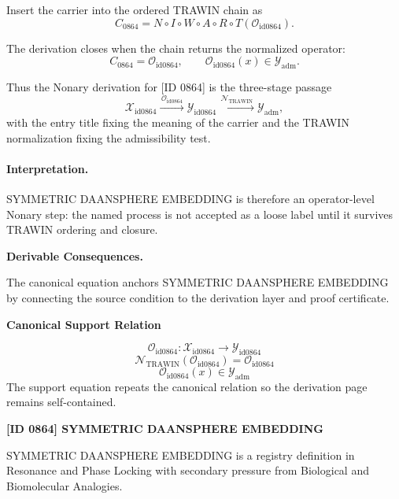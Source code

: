 Insert the carrier into the ordered TRAWIN chain as\[
C_{0864}=N\circ I\circ W\circ A\circ R\circ T(\mathcal{O}_{\mathrm{id0864}}).
\]

The derivation closes when the chain returns the normalized operator:\[
C_{0864}=\mathcal{O}_{\mathrm{id0864}},\qquad \mathcal{O}_{\mathrm{id0864}}(x)\in\mathcal{Y}_{\mathrm{adm}}.
\]

Thus the Nonary derivation for [ID 0864] is the three-stage passage
\[
\mathcal{X}_{\mathrm{id0864}}\xrightarrow{\,\mathcal{O}_{\mathrm{id0864}}\,} \mathcal{Y}_{\mathrm{id0864}}\xrightarrow{\,\mathcal{N}_{\mathrm{TRAWIN}}\,} \mathcal{Y}_{\mathrm{adm}},
\]
with the entry title fixing the meaning of the carrier and the TRAWIN normalization fixing the admissibility test.

\paragraph{Interpretation.} SYMMETRIC DAANSPHERE EMBEDDING is therefore an operator-level Nonary step: the named process is not accepted as a loose label until it survives TRAWIN ordering and closure.

\par\vspace{0.35em}
\noindent\textbf{Derivable Consequences.}\quad
\begingroup
\footnotesize
\raggedright
The canonical equation anchors SYMMETRIC DAANSPHERE EMBEDDING by connecting the source condition to the derivation layer and proof certificate.
\par\endgroup

\noindent\textbf{Canonical Support Relation}\par
\[
\mathcal{O}_{\mathrm{id0864}}:\mathcal{X}_{\mathrm{id0864}}\longrightarrow\mathcal{Y}_{\mathrm{id0864}}
\]
\[
\mathcal{N}_{\mathrm{TRAWIN}}(\mathcal{O}_{\mathrm{id0864}})=\mathcal{O}_{\mathrm{id0864}}
\]
\[
\mathcal{O}_{\mathrm{id0864}}(x)\in\mathcal{Y}_{\mathrm{adm}}
\]
\noindent The support equation repeats the canonical relation so the derivation page remains self-contained.\par

\clearpage
\noindent\textbf{[ID 0864] SYMMETRIC DAANSPHERE EMBEDDING}\par
\vspace{0.35em}
\begingroup\small
{}
SYMMETRIC DAANSPHERE EMBEDDING is a registry definition in Resonance and Phase Locking with secondary pressure from Biological and Biomolecular Analogies.

